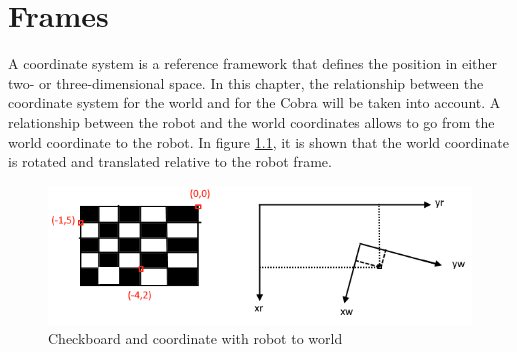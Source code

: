 \chapter{Frames}\label{ch:frames}
A coordinate system is a reference framework that defines the position in either two- or three-dimensional space. In this chapter, the relationship between the coordinate system for the world and for the Cobra will be taken into account. A relationship between the robot and the world coordinates allows to go from the world coordinate to the robot. In figure \ref{fig:check_coordrobottoworld}, it is shown that the world coordinate is rotated and translated relative to the robot frame. 
\begin{figure}[hb]
  \centering
  \includegraphics[width=5.8in]{figures/check_coordinate_robot_world.png}
  \caption[Checkerboard and coordinate with robot to world] {Checkboard and coordinate with robot to world}
  \label{fig:check_coordrobottoworld}
\end{figure}

